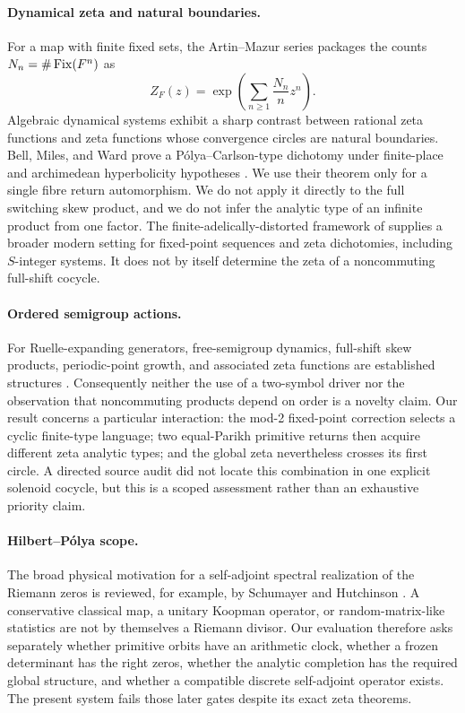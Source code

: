 \paragraph{Dynamical zeta and natural boundaries.}
For a map with finite fixed sets, the Artin--Mazur series
\citep{ArtinMazur1965} packages the counts \(N_n=\#\operatorname{Fix}(F^n)\) as
\[
 Z_F(z)=\exp\left(\sum_{n\ge1}\frac{N_n}{n}z^n\right).
 \tag{2.1}\label{2.1}
\]
Algebraic dynamical systems exhibit a sharp contrast between rational zeta
functions and zeta functions whose convergence circles are natural
boundaries.  Bell, Miles, and Ward prove a P\'olya--Carlson-type dichotomy
under finite-place and archimedean hyperbolicity hypotheses
\citep{BellMilesWard2014}.  We use their theorem only for a single fibre
return automorphism.  We do not apply it directly to the full switching skew
product, and we do not infer the analytic type of an infinite product from
one factor.
The finite-adelically-distorted framework of
\citet{ByszewskiCornelissenHouben2022} supplies a broader modern setting for
fixed-point sequences and zeta dichotomies, including \(S\)-integer systems.
It does not by itself determine the zeta of a noncommuting full-shift cocycle.

\paragraph{Ordered semigroup actions.}
For Ruelle-expanding generators, free-semigroup dynamics, full-shift skew
products, periodic-point growth, and associated zeta functions are established
structures
\citep{CarvalhoRodriguesVarandas2017}.  Consequently neither the use of a
two-symbol driver nor the observation that noncommuting products depend on
order is a novelty claim.  Our result concerns a particular interaction:
the mod-2 fixed-point correction selects a cyclic finite-type language; two
equal-Parikh primitive returns then acquire different zeta analytic types;
and the global zeta nevertheless crosses its first circle.  A directed source
audit did not locate this combination in one explicit solenoid cocycle, but
this is a scoped assessment rather than an exhaustive priority claim.

\paragraph{Hilbert--P\'olya scope.}
The broad physical motivation for a self-adjoint spectral realization of the
Riemann zeros is reviewed, for example, by Schumayer and Hutchinson
\citep{SchumayerHutchinson2011}.  A conservative classical map, a unitary
Koopman operator, or random-matrix-like statistics are not by themselves a
Riemann divisor.  Our evaluation therefore asks separately whether primitive
orbits have an arithmetic clock, whether a frozen determinant has the right
zeros, whether the analytic completion has the required global structure,
and whether a compatible discrete self-adjoint operator exists.  The present
system fails those later gates despite its exact zeta theorems.
